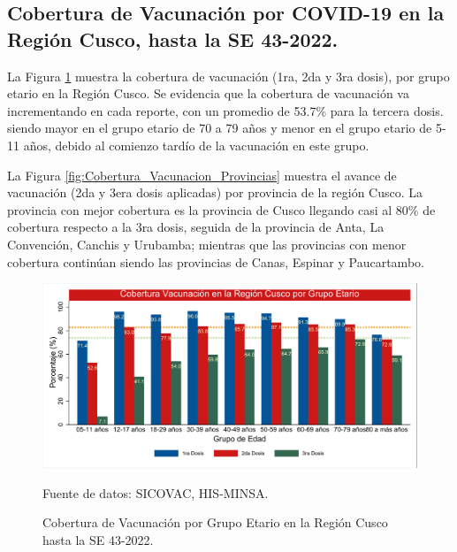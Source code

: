 \documentclass[12pt,a4paper,openany]{book}
\begin{document}
	\subsection*{Cobertura de Vacunación por COVID-19 en la Región Cusco, hasta la SE 43-2022.}
	\noindent La Figura \ref{fig:vacuna_edad} muestra la cobertura de vacunación (1ra, 2da y 3ra dosis), por grupo etario en la Región Cusco. Se evidencia que la cobertura de vacunación va incrementando en cada reporte, con un promedio de 53.7$\%$ para la tercera dosis. siendo mayor en el grupo etario de 70 a 79 años y menor en el grupo etario de 5-11 años, debido al comienzo tardío de la vacunación en este grupo.
	
	La Figura \ref{fig:Cobertura_Vacunacion_Provincias} muestra el avance de vacunación (2da y 3era dosis aplicadas) por provincia de la región Cusco. La provincia con mejor cobertura es la provincia de Cusco llegando casi al 80$\%$ de cobertura respecto a la 3ra dosis, seguida de la provincia de Anta, La Convención, Canchis y Urubamba; mientras que las provincias con menor cobertura continúan siendo las provincias de Canas, Espinar y Paucartambo. 
	\begin{figure}[h]
		\caption{Cobertura de Vacunación por Grupo Etario en la Región Cusco hasta la SE 43-2022. }\label{fig:vacuna_edad}
		\begin{center}
			\includegraphics[width=1\linewidth]{../figuras/vacunacion_grupo_edad_dosis.pdf}
		\end{center}
		{\footnotesize {Fuente de datos: SICOVAC, HIS-MINSA.}}
	\end{figure}
	\clearpage
	
\end{document}
